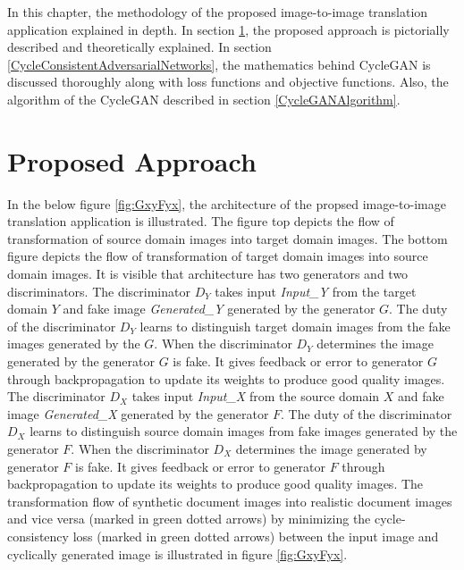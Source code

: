 \justifying
\setlength{\parskip}{1em}

In this chapter, the methodology of the proposed image-to-image translation application explained in depth. In section \ref{ProposedApproach}, the proposed approach is pictorially described and theoretically explained. In section \ref{CycleConsistentAdversarialNetworks}, the mathematics behind \ac{CycleGAN} is discussed thoroughly along with loss functions and objective functions. Also, the algorithm of the \ac{CycleGAN} described in section \ref{CycleGANAlgorithm}.

\section{Proposed Approach}\label{ProposedApproach}

In the below figure \ref{fig:GxyFyx}, the architecture of the propsed image-to-image translation application is illustrated. The figure top depicts the flow of transformation of source domain images into target domain images. The bottom figure depicts the flow of transformation of target domain images into source domain images. It is visible that architecture has two generators and two discriminators. The discriminator $D_Y$ takes input \textit{Input\_Y} from the target domain $Y$ and fake image \textit{Generated\_Y} generated by the generator $G$. The duty of the discriminator $D_Y$ learns to distinguish target domain images from the fake images generated by the $G$. When the discriminator $D_Y$ determines the image generated by the generator $G$ is fake. It gives feedback or error to generator $G$ through backpropagation to update its weights to produce good quality images. The discriminator $D_X$ takes input \textit{Input\_X} from the source domain $X$ and fake image \textit{Generated\_X} generated by the generator $F$. The duty of the discriminator $D_X$ learns to distinguish source domain images from fake images generated by the generator $F$. When the discriminator $D_X$ determines the image generated by generator $F$ is fake. It gives feedback or error to generator $F$ through backpropagation to update its weights to produce good quality images. The transformation flow of synthetic document images into realistic document images and vice versa (marked in green dotted arrows) by minimizing the cycle-consistency loss (marked in green dotted arrows) between the input image and cyclically generated image is illustrated in figure \ref{fig:GxyFyx}.

